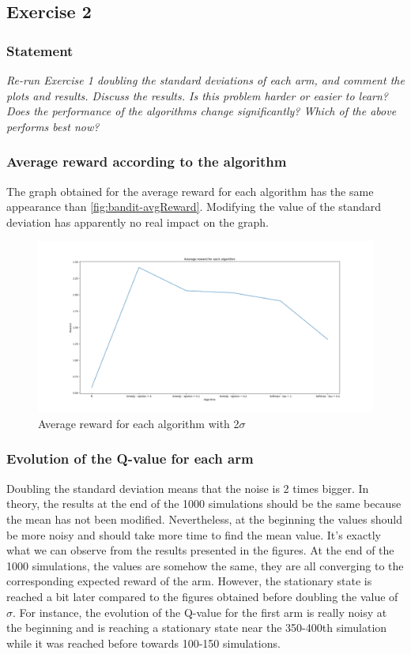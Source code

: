 \documentclass{article}
\begin{document}
\subsection{Exercise 2}

\subsubsection*{Statement}
\textit{Re-run Exercise 1 doubling the standard deviations of each arm, and comment the plots and results. Discuss the results. Is this problem harder or easier to learn? Does the performance of the algorithms change significantly? Which of the above performs best now?} 

\subsubsection{Average reward according to the algorithm}
The graph obtained for the average reward for each algorithm has the same appearance than \autoref{fig:bandit-avgReward}. Modifying the value of the standard deviation has apparently no real impact on the graph. 

\begin{figure}[H]
  \centering
  \includegraphics[scale=0.3]{fig/bandit2-avgReward.png}
  \caption{Average reward for each algorithm with 2$\sigma$}
  \label{fig:bandit2-avgReward}
\end{figure}

\subsubsection{Evolution of the Q-value for each arm}
Doubling the standard deviation means that the noise is 2 times bigger. In theory, the results at the end of the 1000 simulations should be the same because the mean has not been modified. Nevertheless, at the beginning the values should be more noisy and should take more time to find the mean value. It's exactly what we can observe from the results presented in the figures. At the end of the 1000 simulations, the values are somehow the same, they are all converging to the corresponding expected reward of the arm. However, the stationary state is reached a bit later compared to the figures obtained before doubling the value of $\sigma$. For instance, the evolution of the Q-value for the first arm is really noisy at the beginning and is reaching a stationary state near the 350-400th simulation while it was reached before towards 100-150 simulations. 
\end{document}
